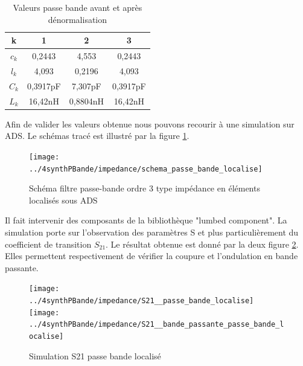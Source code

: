 \documentclass[french]{article}
\begin{document}
\begin{table}[H]
	\centering
	\begin{tabular}{|c|c|c|c|}
		\hline
		k & 1 & 2 & 3 \\
		\hline
		$c_k$ & 0,2443 & 4,553 & 0,2443 \\ \hline
		$l_k$ &	4,093	&	0,2196	&	4,093	\\ \hline
		$C_k$ &	0,3917pF&	7,307pF	&	0,3917pF\\ \hline
		$L_k$ &	16,42nH	&	0,8804nH& 16,42nH	\\ \hline
	\end{tabular}
	\caption{Valeurs passe bande avant et après dénormalisation}
	\label{tab:denorm_BP}
\end{table}
Afin de valider les valeurs obtenue nous pouvons recourir à une simulation sur ADS. Le schémas tracé est illustré par la figure \ref{fig:ads_sch_BP_localise}.
\begin{figure}[H]
	\centering
	\texttt{[image: ../4synthPBande/impedance/schema\_passe\_bande\_localise]}
	\caption{Schéma filtre passe-bande ordre 3 type impédance en éléments localisés sous ADS}
	\label{fig:ads_sch_BP_localise}
\end{figure}
Il fait intervenir des composants de la bibliothèque "lumbed component". La simulation porte sur l'observation des paramètres S et plus particulièrement du coefficient de transition $S_{21}$. Le résultat obtenue est donné par la deux figure \ref{fig:ads_S21_BP_localise1}. Elles permettent respectivement de vérifier la coupure et l'ondulation en bande passante.
\begin{figure}[H]
	\centering
	\texttt{[image: ../4synthPBande/impedance/S21\_\_passe\_bande\_localise]}
	\texttt{[image: ../4synthPBande/impedance/S21\_\_bande\_passante\_passe\_bande\_localise]}
	\caption{Simulation S21 passe bande localisé}
	\label{fig:ads_S21_BP_localise1}
\end{figure}
\end{document}
